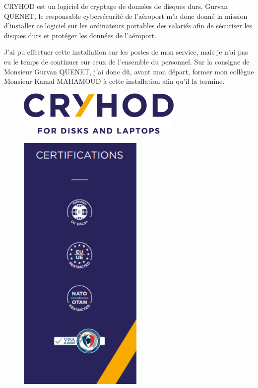 CRYHOD est un logiciel de cryptage de données de disques durs. Gurvan QUENET, le responsable cybersécurité de l’aéroport m’a donc donné la mission d’installer ce logiciel sur les ordinateurs portables des salariés afin de sécuriser les disques durs et protéger les données de l’aéroport.

J’ai pu effectuer cette installation sur les postes de mon service, mais je n'ai pas eu le temps de continuer sur ceux de l'ensemble du personnel. Sur la consigne de Monsieur Gurvan QUENET, j'ai donc dû, avant mon départ, former mon collègue Monsieur Kamal MAHAMOUD à cette installation afin qu'il la termine.\newline

\begin{figure}[hbt!]
  \centering
  \includegraphics[width=8cm]{Images/logo_cryhod.png}
  \label{fig:logocryhod}
\end{figure}

\begin{figure}[hbt!]
  \centering
  \includegraphics[width=6cm]{Images/cryhod.png}
  \label{fig:cryhod}
\end{figure}

